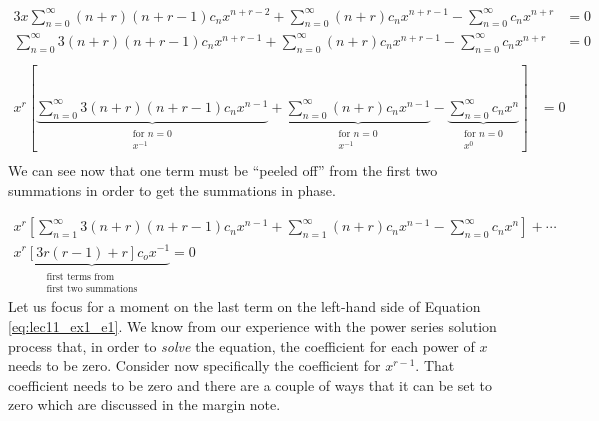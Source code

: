 \begin{align*}
3x\sum\limits_{n=0}^{\infty}(n+r)(n+r-1)c_nx^{n+r-2} + \sum\limits_{n=0}^{\infty}(n+r)c_nx^{n+r-1} - \sum\limits_{n=0}^{\infty}c_nx^{n+r} &= 0 \\
\sum\limits_{n=0}^{\infty}3(n+r)(n+r-1)c_nx^{n+r-1} + \sum\limits_{n=0}^{\infty}(n+r)c_nx^{n+r-1} - \sum\limits_{n=0}^{\infty}c_nx^{n+r} &= 0 \\
\end{align*}
\begin{align*}
x^r\left[\underbrace{\sum\limits_{n=0}^{\infty}3(n+r)(n+r-1)c_nx^{n-1}}_{\substack{\text{for }n=0 \\ x^{-1}}} + \underbrace{\sum\limits_{n=0}^{\infty}(n+r)c_nx^{n-1}}_{\substack{\text{for }n=0 \\ x^{-1}}} - \underbrace{\sum\limits_{n=0}^{\infty}c_nx^n}_{\substack{\text{for }n=0 \\ x^{0}}} \right] &= 0 \\
\end{align*}
We can see now that one term must be ``peeled off'' from the first two summations in order to get the summations in phase. 


\begin{multline}
x^r \left[\sum\limits_{n=1}^{\infty} 3(n+r)(n+r-1)c_nx^{n-1} + \sum\limits_{n=1}^{\infty} (n+r)c_nx^{n-1} - \sum\limits_{n=0}^{\infty}c_nx^n \right] + \cdots \\
\underbrace{x^r\left[3r(r-1) + r \right]c_ox^{-1}}_{\substack{\text{first terms from} \\ \text{first two summations}}} = 0
\label{eq:lec11_ex1_e1}
\end{multline}
Let us focus for a moment on the last term on the left-hand side of Equation \ref{eq:lec11_ex1_e1}.  We know from our experience with the power series solution process that, in order to \emph{solve} the equation, the coefficient for each power of $x$ needs to be zero.  Consider now specifically the coefficient for $x^{r-1}$.  That coefficient needs to be zero and there are a couple of ways that it can be set to zero which are discussed in the margin note.

